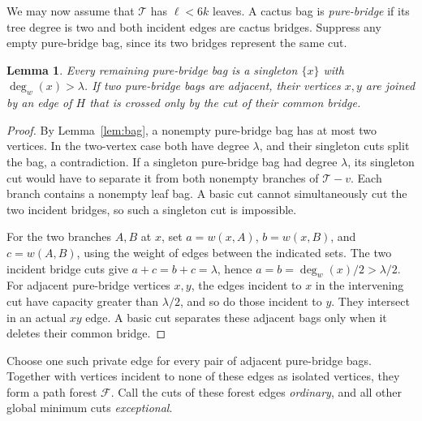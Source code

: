 \documentclass[10pt,letterpaper]{article}
\newtheorem{lemma}{Lemma}
\newcommand{\forest}{\mathcal F}
\newcommand{\tree}{\mathcal T}
\begin{document}
We may now assume that \(\tree\) has \(\ell<6k\) leaves. A cactus bag is \emph{pure-bridge} if its tree degree is two and both incident edges are cactus bridges. Suppress any empty pure-bridge bag, since its two bridges represent the same cut.

\begin{lemma}\label{lem:forest}
Every remaining pure-bridge bag is a singleton \(\{x\}\) with \(\deg_w(x)>\lambda\). If two pure-bridge bags are adjacent, their vertices \(x,y\) are joined by an edge of \(H\) that is crossed only by the cut of their common bridge.
\end{lemma}
\begin{proof}
By Lemma~\ref{lem:bag}, a nonempty pure-bridge bag has at most two vertices. In the two-vertex case both have degree \(\lambda\), and their singleton cuts split the bag, a contradiction. If a singleton pure-bridge bag had degree \(\lambda\), its singleton cut would have to separate it from both nonempty branches of \(\tree-v\). Each branch contains a nonempty leaf bag. A basic cut cannot simultaneously cut the two incident bridges, so such a singleton cut is impossible.

For the two branches \(A,B\) at \(x\), set \(a=w(x,A)\), \(b=w(x,B)\), and \(c=w(A,B)\), using the weight of edges between the indicated sets. The two incident bridge cuts give \(a+c=b+c=\lambda\), hence \(a=b=\deg_w(x)/2>\lambda/2\). For adjacent pure-bridge vertices \(x,y\), the edges incident to \(x\) in the intervening cut have capacity greater than \(\lambda/2\), and so do those incident to \(y\). They intersect in an actual \(xy\) edge. A basic cut separates these adjacent bags only when it deletes their common bridge.
\end{proof}

Choose one such private edge for every pair of adjacent pure-bridge bags. Together with vertices incident to none of these edges as isolated vertices, they form a path forest \(\forest\). Call the cuts of these forest edges \emph{ordinary}, and all other global minimum cuts \emph{exceptional}.
\end{document}
